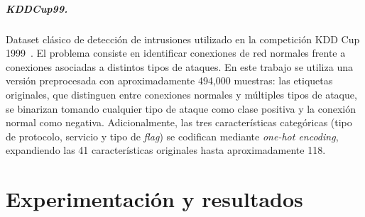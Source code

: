 \paragraph{KDDCup99.}
Dataset clásico de detección de intrusiones utilizado en la competición KDD Cup 1999~\cite{kddcup99}. El problema consiste en identificar conexiones de red normales frente a conexiones asociadas a distintos tipos de ataques. En este trabajo se utiliza una versión preprocesada con aproximadamente 494,000 muestras: las etiquetas originales, que distinguen entre conexiones normales y múltiples tipos de ataque, se binarizan tomando cualquier tipo de ataque como clase positiva y la conexión normal como negativa. Adicionalmente, las tres características categóricas (tipo de protocolo, servicio y tipo de \textit{flag}) se codifican mediante \textit{one-hot encoding}, expandiendo las 41 características originales hasta aproximadamente 118.

\begin{table}[ht]
\centering
\caption{Conjuntos de datos utilizados.}
\label{tab:datasets}
\small

\end{table}

\chapter{Experimentación y resultados}
\label{chap:experimentacion_resultados}

